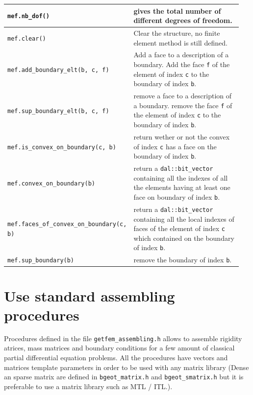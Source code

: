 \documentclass[11pt,a4paper]{article}
\begin{document}
\begin{center}
\begin{tabular}{|m{0.4\linewidth}|m{0.55\linewidth}|}
  {\tt mef.nb\_dof()} & gives the total number of different degrees of freedom.  \\ \hline

  {\tt mef.clear()} & Clear the structure, no finite element method is still defined.  \\ \hline

  {\tt mef.add\_boundary\_elt(b, c, f)} & Add a face to a description of a boundary. Add the face {\tt f} of the element of index {\tt c} to the boundary of index {\tt b}.  \\ \hline
  
  {\tt mef.sup\_boundary\_elt(b, c, f)} & remove a face to a description of a boundary. remove the face {\tt f} of the element of index {\tt c} to the boundary of index {\tt b}.  \\ \hline
  
  {\tt mef.is\_convex\_on\_boundary(c, b)} & return wether or not the convex of index {\tt c}  has a face on the boundary of index {\tt b}.  \\ \hline
  
  {\tt mef.convex\_on\_boundary(b)} & return a {\tt dal::bit\_vector} containing all the indexes of all the elements having at least one face on boundary of index {\tt b}.  \\ \hline

  {\tt mef.faces\_of\_convex\_on\_boundary(c, b) } & return a {\tt dal::bit\_vector} containing all the local indexes of faces of the element of index {\tt c} which contained on the boundary of index {\tt b}.  \\ \hline

  {\tt mef.sup\_boundary(b) } & remove the boundary of index {\tt b}.  \\ \hline

\end{tabular} \end{center}


\section{Use standard assembling procedures}

Procedures defined in the file {\tt getfem\_assembling.h} allows to assemble rigidity atrices, mass matrices and boundary conditions for a few amount of classical partial differential equation problems. All the procedures have vectors and matrices template parameters in order to be used with any matrix library (Dense an sparse matrix are defined in {\tt bgeot\_matrix.h} and {\tt bgeot\_smatrix.h} but it is preferable to use a matrix library such as MTL / ITL.).
\end{document}
